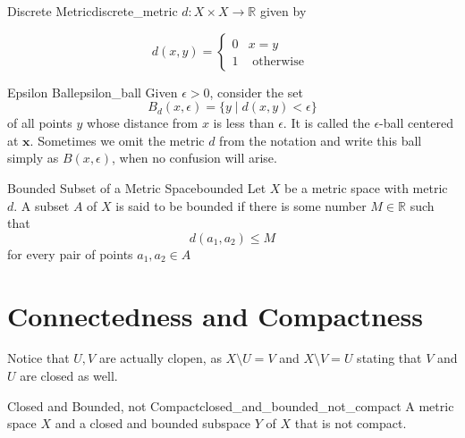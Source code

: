 \begin{example}{Discrete Metric}{discrete_metric}
 $d: X \times X \rightarrow \mathbb{R}$ given by

\[
d(x, y)= \begin{cases}0 & x=y \\ 1 & \text { otherwise }\end{cases}
\]
\end{example}


\begin{definition}{Epsilon Ball}{epsilon_ball}
Given $\epsilon>0$, consider the set
\[
B_{d}(x, \epsilon)=\{y \mid d(x, y)<\epsilon\}
\]
of all points $y$ whose distance from $x$ is less than $\epsilon$. It is called the $\epsilon$-ball centered at $\boldsymbol{x}$. Sometimes we omit the metric $d$ from the notation and write this ball simply as $B(x, \epsilon)$, when no confusion will arise.
\end{definition}








\begin{definition}{Bounded Subset of a Metric Space}{bounded}
Let $X$ be a metric space with metric $d$. A subset $A$ of $X$ is said to be bounded if there is some number $M \in  \mathbb{R}$ such that
\[
d\left(a_{1}, a_{2}\right) \leq M
\]
for every pair of points $ a_{ 1 } , a_{ 2 } \in  A $ 
\end{definition}






\section{Connectedness and Compactness}




Notice that $ U, V $ are actually clopen, as $ X \setminus  U =  V $ and $ X \setminus  V = U $ stating that $ V $ and $ U $ are closed as well.

\begin{example}{Closed and Bounded, not Compact}{closed_and_bounded_not_compact}
A metric space $X$  and a closed and bounded subspace $Y$ of  $X$  that is not compact.
\end{example}


